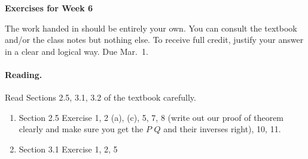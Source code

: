 \documentclass[11pt]{article}
\theoremstyle{plain}
\theoremstyle{definition}
\begin{document}
\begin{center}
{\Large \bf Exercises for Week 6}
\end{center}
The work handed in should be entirely your own. You can consult the textbook and/or the class notes but nothing else. To receive full credit, justify your answer in a clear and logical way. Due Mar.~1.

\paragraph{Reading.} Read Sections 2.5, 3.1, 3.2 of the textbook carefully.

\begin{enumerate}
\item Section 2.5 Exercise 1, 2 (a), (c), 5, 7, 8 (write out our proof of theorem clearly and make sure you get the $P$ $Q$ and their inverses right), 10, 11.
\item Section 3.1 Exercise 1, 2, 5
\end{enumerate}
\end{document}
